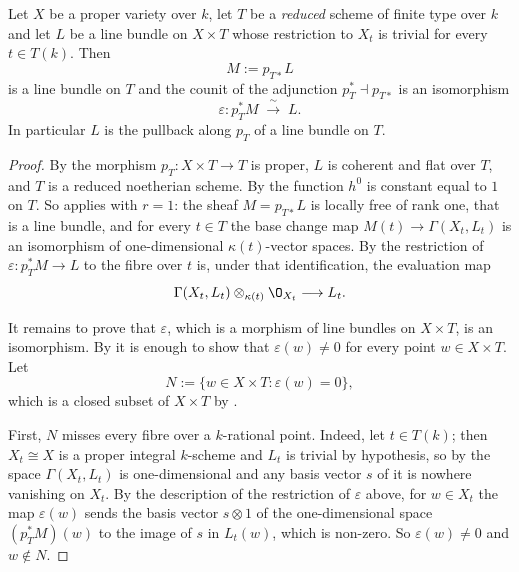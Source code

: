 \begin{theorem}\label{thm:cube-seesaw}
Let $X$ be a proper variety over $k$, let $T$ be a \emph{reduced} scheme of
finite type over $k$ and let $L$ be a line bundle on $X\times T$ whose
restriction to $X_t$ is trivial for every $t\in T(k)$.  Then
\[
  M:=p_{T*}L
\]
is a line bundle on $T$ and the counit of the adjunction
$p_T^*\dashv p_{T*}$ is an isomorphism
\[
  \varepsilon\colon p_T^*M\;\xrightarrow{\ \sim\ }\;L .
\]
In particular $L$ is the pullback along $p_T$ of a line bundle on $T$.
\end{theorem}
\begin{proof}
By  the morphism
$p_T\colon X\times T\to T$ is proper, $L$ is coherent and flat over $T$, and
$T$ is a reduced noetherian scheme.  By  the
function $h^0$ is constant equal to $1$ on $T$.  So 
applies with $r=1$: the sheaf $M=p_{T*}L$ is locally free of rank one, that is
a line bundle, and for every $t\in T$ the base change map
$M(t)\to\Gamma(X_t,L_t)$ is an isomorphism of one-dimensional
$\kappa(t)$-vector spaces.  By  the restriction of
$\varepsilon\colon p_T^*M\to L$ to the fibre over $t$ is, under that
identification, the evaluation map
\[
  \Gamma(X_t,L_t)\otimes_{\kappa(t)}\O_{X_t}\longrightarrow L_t .
\]

It remains to prove that $\varepsilon$, which is a morphism of line bundles on
$X\times T$, is an isomorphism.  By  it is
enough to show that $\varepsilon(w)\neq0$ for every point
$w\in X\times T$.  Let
\[
  N:=\{w\in X\times T:\varepsilon(w)=0\} ,
\]
which is a closed subset of $X\times T$ by .

First, $N$ misses every fibre over a $k$-rational point.  Indeed, let
$t\in T(k)$; then $X_t\cong X$ is a proper integral $k$-scheme and $L_t$ is
trivial by hypothesis, so by  the space
$\Gamma(X_t,L_t)$ is one-dimensional and any basis vector $s$ of it is nowhere
vanishing on $X_t$.  By the description of the restriction of $\varepsilon$
above, for $w\in X_t$ the map $\varepsilon(w)$ sends the basis vector
$s\otimes1$ of the one-dimensional space $(p_T^*M)(w)$ to the image of $s$ in
$L_t(w)$, which is non-zero.  So $\varepsilon(w)\neq0$ and
$w\notin N$.


\end{proof}
